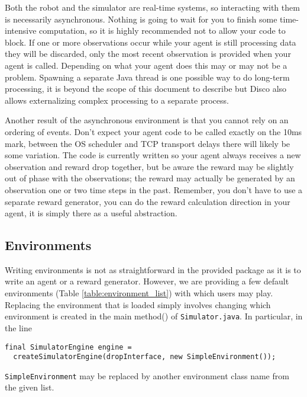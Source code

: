 \documentclass[12pt]{article}
\begin{document}
Both the robot and the simulator are real-time systems, so interacting with them is necessarily asynchronous.  Nothing is going to wait for you to finish some time-intensive computation, so it is highly recommended not to allow your code to block.  If one or more observations occur while your agent is still processing data they will be discarded, only the most recent observation is provided when your agent is called.  Depending on what your agent does this may or may not be a problem.  Spawning a separate Java thread is one possible way to do long-term processing, it is beyond the scope of this document to describe but Disco also allows externalizing complex processing to a separate process.

Another result of the asynchronous environment is that you cannot rely on an ordering of events.  Don't expect your agent code to be called exactly on the 10ms mark, between the OS scheduler and TCP transport delays there will likely be some variation.  The code is currently written so your agent always receives a new observation and reward drop together, but be aware the reward may be slightly out of phase with the observations; the reward may actually be generated by an observation one or two time steps in the past.  Remember, you don't have to use a separate reward generator, you can do the reward calculation direction in your agent, it is simply there as a useful abstraction.

\subsection{Environments}

Writing environments is not as straightforward in the provided package as it
is to write an agent or a reward generator. However, we are providing a few
default environments (Table \ref{table:environment_list}) with which users may 
play. Replacing the environment that is loaded simply involves changing 
which environment is created in the main method() of \verb+Simulator.java+.
In particular, in the line

\begin{verbatim}
final SimulatorEngine engine = 
  createSimulatorEngine(dropInterface, new SimpleEnvironment());
\end{verbatim}

\verb+SimpleEnvironment+ may be replaced by another environment class name
from the given list.
\end{document}
